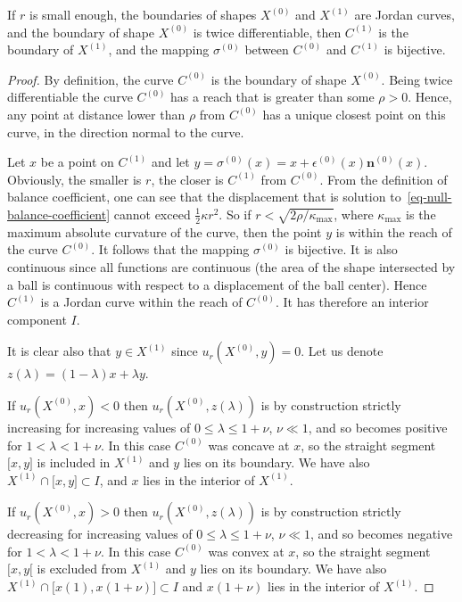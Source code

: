 \documentclass[review]{siamart220329}
\begin{document}
\begin{proposition} \label{prop-C-equ-X}
  If $r$ is small enough, the boundaries of shapes $X^{(0)}$ and
  $X^{(1)}$ are Jordan curves, and the boundary of shape $X^{(0)}$ is
  twice differentiable, then $C^{(1)}$ is the boundary of $X^{(1)}$,
  and the mapping $\sigma^{(0)}$ between $C^{(0)}$ and $C^{(1)}$ is
  bijective.
\end{proposition}
\begin{proof}
  By definition, the curve $C^{(0)}$ is the boundary of shape
  $X^{(0)}$. 
  Being twice differentiable the curve $C^{(0)}$ has a reach that is
  greater than some $\rho > 0$. Hence, any point at distance lower
  than $\rho$ from $C^{(0)}$ has a unique closest point on this
  curve, in the direction normal to the curve.

  Let $x$ be a point on $C^{(1)}$ and let
  $y=\sigma^{(0)}(x)=x+\epsilon^{(0)}(x) \mathbf{n}^{(0)}(x)$.
  Obviously, the smaller is $r$, the closer is $C^{(1)}$ from
  $C^{(0)}$.  From the definition of balance coefficient, one can see
  that the displacement that is solution to~\cref{eq-null-balance-coefficient} cannot exceed $\frac{1}{2}\kappa
  r^2$. So if $r < \sqrt{2\rho / \kappa_{\max}}$, where
  $\kappa_{\max}$ is the maximum absolute curvature of the curve, then
  the point $y$ is within the reach of the curve $C^{(0)}$. It follows
  that the mapping $\sigma^{(0)}$ is bijective. It is also continuous
  since all functions are continuous (the area of the shape
  intersected by a ball is continuous with respect to a displacement
  of the ball center).  Hence $C^{(1)}$ is a Jordan curve within the
  reach of $C^{(0)}$. It has therefore an interior component $I$.

  It is clear also that $y \in X^{(1)}$ since $u_r(X^{(0)},y)=0$.
  Let us denote $z(\lambda)=(1-\lambda)x+\lambda y$.

  If $u_r(X^{(0)},x)<0$ then $u_r(X^{(0)},z(\lambda))$ is by
  construction strictly increasing for increasing values of $0 \le
  \lambda \le 1+\nu$, $\nu \ll 1$, and so becomes positive for
  $1<\lambda < 1 + \nu$. In this case $C^{(0)}$ was concave at $x$,
  so the straight segment $\lbrack x,y \rbrack$ is included in
  $X^{(1)}$ and $y$ lies on its boundary. We have also $X^{(1)}
  \cap \lbrack x,y \rbrack \subset I$, and $x$ lies in the interior of
  $X^{(1)}$.
  
  If $u_r(X^{(0)},x)>0$ then $u_r(X^{(0)},z(\lambda))$ is by
  construction strictly decreasing for increasing values of $0 \le
  \lambda \le 1+\nu$, $\nu \ll 1$, and so becomes negative for
  $1<\lambda < 1 + \nu$.  In this case $C^{(0)}$ was convex at $x$,
  so the straight segment $\lbrack x,y \lbrack$ is excluded from
  $X^{(1)}$ and $y$ lies on its boundary. We have also $X^{(1)}
  \cap \lbrack x(1),x(1+\nu) \rbrack \subset I$ and $x(1+\nu)$ lies in
  the interior of $X^{(1)}$.


\end{proof}
\end{document}
